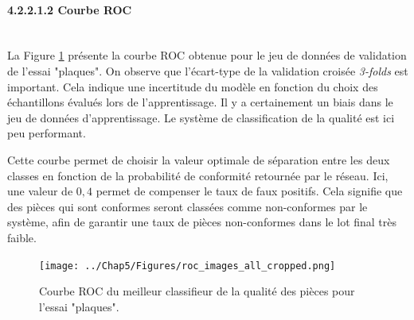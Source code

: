 \paragraph{4.2.2.1.2 Courbe ROC} \mbox{} \\
La Figure \ref{fig:po_roc} présente la courbe ROC obtenue pour le jeu de données de validation de l'essai "plaques".
On observe que l'écart-type de la validation croisée \textit{3-folds} est important.
Cela indique une incertitude du modèle en fonction du choix des échantillons évalués lors de l'apprentissage.
Il y a certainement un biais dans le jeu de données d'apprentissage.
Le système de classification de la qualité est ici peu performant.

Cette courbe permet de choisir la valeur optimale de séparation entre les deux classes en fonction de la probabilité de conformité retournée par le réseau.
Ici, une valeur de $0,4$ permet de compenser le taux de faux positifs.
Cela signifie que des pièces qui sont conformes seront classées comme non-conformes par le système, afin de garantir une taux de pièces non-conformes dans le lot final très faible.

\begin{figure}[p!]
	\centering
	\texttt{[image: ../Chap5/Figures/roc\_images\_all\_cropped.png]}
	\caption{Courbe ROC du meilleur classifieur de la qualité des pièces pour l'essai "plaques".}
	\label{fig:po_roc}
\end{figure}

\FloatBarrier